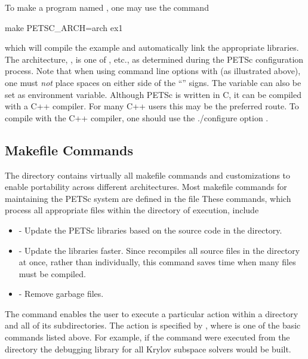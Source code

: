 {{To make a program named , one may use the command
\begin{bashlisting}
make PETSC_ARCH=arch ex1
\end{bashlisting}
which will compile the
example and automatically link the appropriate libraries.  The
architecture, , is one of , etc., as determined during the PETSc configuration process.
Note that when using command line options with  (as illustrated above),
one must {\em not} place spaces on either side of the ``\trl{=}'' signs.
The variable  can also be set as environment
variable.  Although PETSc is written in C, it can be compiled with a
C++ compiler.  For many C++ users this may be the preferred route. To compile
with the C++ compiler, one should use the ./configure option . 

\subsection{Makefile Commands} \label{sec_common}

The directory 
contains virtually all
makefile commands and customizations to enable portability across
different architectures.  Most makefile commands for maintaining the
PETSc system are defined in the file 
These commands, which process all appropriate files within the
directory of execution, include
\begin{itemize}
\item {} - Update the PETSc libraries based on the source code
      in the directory.
\item {} - Update the libraries faster.  Since
       recompiles all source files in the directory at once,
      rather than individually, this command saves time when many files
      must be compiled.
\item {} - Remove garbage files.
\end{itemize}

The  command enables the user to execute a particular action
within a directory and all of its subdirectories.  The action is specified
by , where  is one of the basic commands
listed above. For example, if the command
were executed from the directory 
the debugging library for all Krylov subspace solvers would be built.

}}
